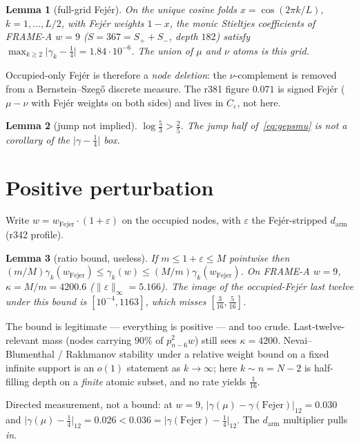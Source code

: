 \documentclass[11pt]{article}
\newtheorem{lemma}{Lemma}
\theoremstyle{remark}
\newcommand{\eps}{\varepsilon}
\begin{document}
\begin{lemma}[full-grid Fej\'er]\label{lem:bs}
On the unique cosine folds $x=\cos(2\pi k/L)$, $k=1,\ldots,L/2$,
with Fej\'er weights $1-x$, the monic Stieltjes coefficients of
FRAME-A $w=9$ ($S=367=S_++S_-$, depth $182$) satisfy
$\max_{k\ge 2}\lvert\gamma_k-\tfrac14\rvert=1.84\cdot10^{-6}$.
The union of $\mu$ and $\nu$ atoms \emph{is} this grid.
\end{lemma}

Occupied-only Fej\'er is therefore a \emph{node deletion}: the
$\nu$-complement is removed from a Bernstein--Szeg\H{o} discrete
measure.  The r381 figure $0.071$ is signed Fej\'er
($\mu-\nu$ with Fej\'er weights on both sides) and lives in
$C_\varepsilon$, not here.

\begin{lemma}[jump not implied]\label{lem:jump}
$\log\tfrac53>\tfrac25$.  The jump half of~\eqref{eq:gepsmu}
is not a corollary of the $\lvert\gamma-\tfrac14\rvert$ box.
\end{lemma}

\section{Positive perturbation}\label{sec:pert}

Write $w=w_{\mathrm{Fejer}}\cdot(1+\eps)$ on the occupied nodes,
with $\eps$ the Fej\'er-stripped $d_{\mathrm{arm}}$ (r342 profile).

\begin{lemma}[ratio bound, useless]\label{lem:ratio}
If $m\le 1+\eps\le M$ pointwise then
$(m/M)\gamma_k(w_{\mathrm{Fejer}})\le\gamma_k(w)\le(M/m)\gamma_k(w_{\mathrm{Fejer}})$.
On FRAME-A $w=9$, $\kappa=M/m=4200.6$
($\lVert\eps\rVert_\infty=5.166$).
The image of the occupied-Fej\'er last twelve under this bound
is $[10^{-4},1163]$, which misses $[\tfrac3{16},\tfrac5{16}]$.
\end{lemma}

The bound is legitimate --- everything is positive --- and too
crude.  Last-twelve-relevant mass (nodes carrying $90\%$ of
$p_{n-6}^2 w$) still sees $\kappa=4200$.
Nevai--Blumenthal / Rakhmanov stability under a relative weight
bound on a fixed infinite support is an $o(1)$ statement as
$k\to\infty$; here $k\sim n=N-2$ is half-filling depth on a
\emph{finite} atomic subset, and no rate yields $\tfrac1{16}$.

Directed measurement, not a bound: at $w=9$,
$\lvert\gamma(\mu)-\gamma(\mathrm{Fejer})\rvert_{12}=0.030$
and $\lvert\gamma(\mu)-\tfrac14\rvert_{12}=0.026<0.036=\lvert\gamma(\mathrm{Fejer})-\tfrac14\rvert_{12}$.
The $d_{\mathrm{arm}}$ multiplier pulls \emph{in}.
\end{document}
